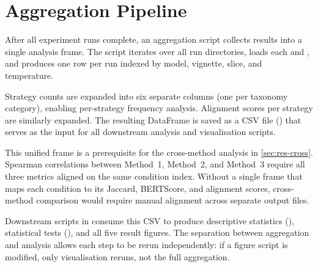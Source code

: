 

\section{Aggregation Pipeline}
\label{sec:impl-aggregation}

After all experiment runs complete, an aggregation script collects results
into a single analysis frame. The script iterates over all run directories,
loads each  and , and produces one
row per run indexed by model, vignette, slice, and temperature.

Strategy counts are expanded into six separate columns (one per taxonomy
category), enabling per-strategy frequency analysis. Alignment scores per
strategy are similarly expanded. The resulting DataFrame is saved as a CSV
file () that serves as the input for all
downstream analysis and visualisation scripts.

This unified frame is a prerequisite for the cross-method analysis in
\autoref{sec:res-cross}. Spearman correlations between Method~1, Method~2,
and Method~3 require all three metrics aligned on the same condition index.
Without a single frame that maps each condition to its Jaccard, BERTScore,
and alignment scores, cross-method comparison would require manual alignment
across separate output files.

Downstream scripts in  consume this CSV to produce
descriptive statistics (), statistical tests
(), and all five result figures. The separation between
aggregation and analysis allows each step to be rerun independently: if a
figure script is modified, only visualisation reruns, not the full
aggregation.
